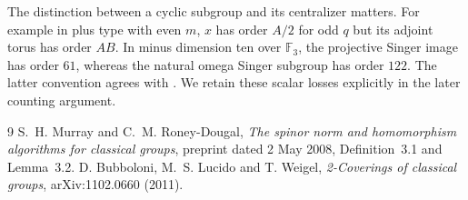 \documentclass[11pt,a4paper]{article}
\newcommand{\F}{\mathbb F}
\begin{document}
The distinction between a cyclic subgroup and its centralizer matters.
For example in plus type with even $m$, $x$ has order $A/2$ for odd $q$
but its adjoint torus has order $AB$. In minus dimension ten over
$\F_3$, the projective Singer image has order $61$, whereas the natural
omega Singer subgroup has order $122$. The latter convention agrees
with \cite[Table~1]{BLW}. We retain these scalar losses explicitly in
the later counting argument.

\begin{thebibliography}{9}\small
{} S.~H. Murray and C.~M. Roney-Dougal,
\emph{The spinor norm and homomorphism algorithms for classical groups},
preprint dated 2 May 2008, Definition~3.1 and Lemma~3.2.
 D. Bubboloni, M.~S. Lucido and T. Weigel,
\emph{2-Coverings of classical groups}, arXiv:1102.0660 (2011).
\end{thebibliography}
\end{document}
